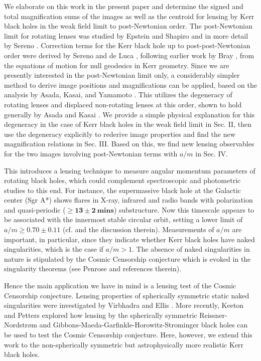 \documentclass[prd,12pt,a4paper,showpacs]{revtex4}
\begin{document}
We elaborate on this work in the present paper and determine the 
signed and total magnification sums of the images as well as the 
centroid for lensing by Kerr black holes in the weak field limit to 
post-Newtonian order. The post-Newtonian limit for rotating lenses was studied by 
Epstein and Shapiro \cite{epstein} and in more detail by 
Sereno \cite{sereno2}. Correction terms for the Kerr black hole up to post-post-Newtonian order 
were derived by Sereno and de Luca \cite{sereno1}, following earlier work by 
Bray \cite{bray}, from the equations of motion for null geodesics in Kerr geometry. 
Since we are presently interested in the post-Newtonian limit only, 
a considerably simpler method to derive image positions and magnifications can be 
applied, based on the analysis by Asada, Kasai, and Yamamoto \cite{asada}. 
This utilizes the degeneracy of rotating lenses and displaced 
non-rotating lenses at this order, shown to hold generally by 
Asada and Kasai \cite{asada2}. We provide a simple physical explanation for this 
degeneracy in the case of Kerr black holes in the weak field limit in Sec. II, 
then use the degeneracy explicitly to rederive image properties and 
find the new magnification relations in Sec. III. Based on this, we find new 
lensing observables for the two images involving post-Newtonian terms with $a/m$ in Sec. IV. 

This introduces a lensing technique to measure angular momentum parameters 
of rotating black holes, which could complement spectroscopic and photometric studies 
to this end. For instance, the supermassive black hole at the Galactic 
center (Sgr A*) shows flares in X-ray, infrared and radio bands with polarization 
and quasi-periodic ($\geq \mathbf{13 \pm 2 \ mins}$) substructure. Now this timescale 
appears to be associated with the innermost stable circular orbit, setting a lower limit 
of $a/m \geq 0.70 \pm 0.11$ (cf. \cite{trippe} and the discussion therein). Measurements 
of $a/m$ are important, in particular, since they indicate whether Kerr black holes 
have naked singularities, which is the case if $a/m>1$. The absence of naked 
singularities in nature is stipulated by the Cosmic Censorship conjecture 
which is evoked in the singularity theorems (see Penrose \cite{penrose} 
and references therein).

Hence the main application we have in mind is a lensing test 
of the Cosmic Censorship conjecture. Lensing properties of spherically symmetric 
static naked singularities were investigated by Virbhadra and Ellis \cite{virbhadra1}. 
More recently, Keeton and Petters \cite{keeton1} explored how lensing by the 
spherically symmetric Reissner-Nordstr\o m and Gibbons-Maeda-Garfinkle-Horowitz-Strominger 
black holes can be used to test the Cosmic Censorship conjecture. 
Here, however, we extend this work to the non-spherically symmetric but 
astrophysically more realistic Kerr black holes.
\end{document}
